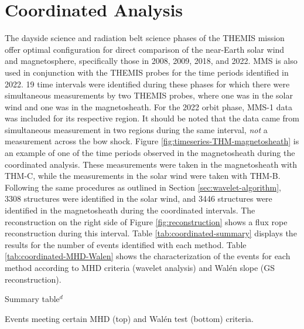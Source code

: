 \chapter{Coordinated Analysis}

The dayside science and radiation belt science phases of the THEMIS mission offer optimal configuration for direct comparison of the near-Earth solar wind and magnetosphere, specifically those in 2008, 2009, 2018, and 2022. MMS is also used in conjunction with the THEMIS probes for the time periods identified in 2022. 19 time intervals were identified during these phases for which there were simultaneous measurements by two THEMIS probes, where one was in the solar wind and one was in the magnetosheath. For the 2022 orbit phase, MMS-1 data was included for its respective region. It should be noted that the data came from simultaneous measurement in two regions during the same interval, \textit{not} a measurement across the bow shock. Figure \ref{fig:timeseries-THM-magnetosheath} is an example of one of the time periods observed in the magnetosheath during the coordinated analysis. These measurements were taken in the magnetosheath with THM-C, while the measurements in the solar wind were taken with THM-B.
Following the same procedures as outlined in Section \ref{sec:wavelet-algorithm}, 3308 structures were identified in the solar wind, and 3446 structures were identified in the magnetosheath during the coordinated intervals. The reconstruction on the right side of Figure \ref{fig:reconstruction} shows a flux rope reconstruction during this interval. Table \ref{tab:coordinated-summary} displays the results for the number of events identified with each method. Table \ref{tab:coordinated-MHD-Walen} shows the characterization of the events for each method according to MHD criteria (wavelet analysis) and Wal\'en slope (GS reconstruction).

\begin{table}
    \centering
    \caption{Summary table$^d$}
    
    \label{tab:coordinated-summary}
\end{table}

\begin{table}
    \centering
    \caption{Events meeting certain MHD (top) and Wal\'en test (bottom) criteria.}
    
    \label{tab:coordinated-MHD-Walen}
\end{table}

